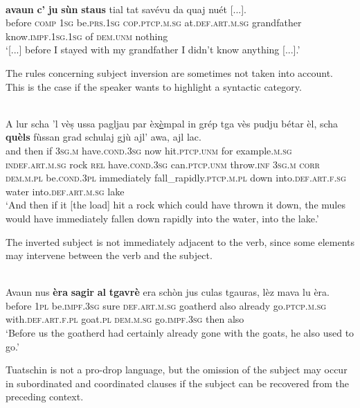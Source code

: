 \ea
\label{}
\\
\gll  [...] \textbf{avaun} \textbf{c’} \textbf{ju} \textbf{sùn} \textbf{staus} tial tat savévu da quaj nuét [...].\\
{} before \textsc{comp} \textsc{1sg} be.\textsc{prs.1sg} \textsc{cop.ptcp.m.sg} at.\textsc{def.art.m.sg} grandfather know.\textsc{impf.1sg.1sg} of \textsc{dem.unm} nothing\\
\glt `[...] before I stayed with my grandfather I didn’t know anything [...].'
\z

The rules concerning subject inversion are sometimes not taken into account. This is the case if the speaker wants to highlight a syntactic category.

\ea
\label{}
\\
\gll   A lur scha ’l vèṣ ussa pagljau par èx\underline{è}mpal in grép tga vès pudju bétar èl, scha \textbf{quèls} fùssan grad schulaj gjù ajl’ awa, ajl lac.\\
and then if \textsc{3sg.m} have.\textsc{cond.3sg} now hit.\textsc{ptcp.unm} for example.\textsc{m.sg} \textsc{indef.art.m.sg} rock \textsc{rel} have.\textsc{cond.3sg} can.\textsc{ptcp.unm} throw.\textsc{inf} \textsc{3sg.m} \textsc{corr} \textsc{dem.m.pl} be.\textsc{cond.3pl} immediately fall\_rapidly.\textsc{ptcp.m.pl} down into.\textsc{def.art.f.sg} water into.\textsc{def.art.m.sg} lake\\
\glt `And then if it [the load] hit a rock which could have thrown it down, the mules would have immediately fallen down rapidly into the water, into the lake.'
\z


The inverted subject is not immediately adjacent to the verb, since some elements may intervene between the verb and the subject.

\ea
\label{}
\\
	\gll    Avaun nus \textbf{èra} \textbf{sagir} \textbf{al} \textbf{tgavrè} era schòn jus culas tgauras, lèz mava lu èra.\\
before \textsc{1pl} be.\textsc{impf.3sg} sure \textsc{def.art.m.sg} goatherd also already go.\textsc{ptcp.m.sg} with.\textsc{def.art.f.pl} goat.\textsc{pl} \textsc{dem.m.sg} go.\textsc{impf.3sg} then also\\
\glt `Before us the goatherd had certainly already gone with the goats, he also used to go.'
\z


Tuatschin is not a pro-drop language, but the omission of the subject may occur in subordinated and coordinated clauses if the subject can be recovered from the preceding context.

